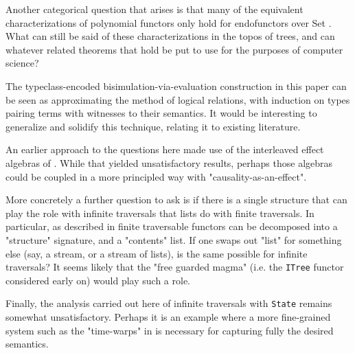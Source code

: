 \documentclass[hoptionsi,review,format=sigplan]{acmart}
\newcommand{\hs}{\texttt}
\begin{document}
Another categorical question that arises is that many of the equivalent characterizations of polynomial functors only hold for endofunctors over Set \cite{spivak2022reference}. What can still be said of these characterizations in the topos of trees, and can whatever related theorems that hold be put to use for the purposes of computer science?

The typeclass-encoded bisimulation-via-evaluation construction in this paper can be seen as approximating the method of logical relations, with induction on types pairing terms with witnesses to their semantics. It would be interesting to generalize and solidify this technique, relating it to existing literature.

An earlier approach to the questions here made use of the interleaved effect algebras of \cite{interleaving, induction-with-effects}. While that yielded unsatisfactory results, perhaps those algebras could be coupled in a more principled way with "causality-as-an-effect".

More concretely a further question to ask is if there is a single structure that can play the role with infinite traversals that lists do with finite traversals. In particular, as described in \cite{bird2013understanding} finite traversable functors can be decomposed into a "structure" signature, and a "contents" list. If one swaps out "list" for something else (say, a stream, or a stream of lists), is the same possible for infinite traversals? It seems likely that the "free guarded magma" (i.e. the \hs{ITree} functor considered early on) would play such a role.

Finally, the analysis carried out here of infinite traversals with \hs{State} remains somewhat unsatisfactory. Perhaps it is an example where a more fine-grained system such as the "time-warps" in \cite{guatto:2018} is necessary for capturing fully the desired semantics.

\begin{comment}
\begin{acks}
This work grew out of some early discussions with Edward Kmett and Dan Doel that posed the questions that motivate it. The basic idea took shape after a useful discussion with Bob Atkey, after which it simmered for some years. Thanks are due to Callan McGill and Jeff Polakow for comments on the draft. And special thanks are due to James Deikun for many useful ideas, not least suggesting the name "Predictable". \end{acks}
\end{comment}
\end{document}

